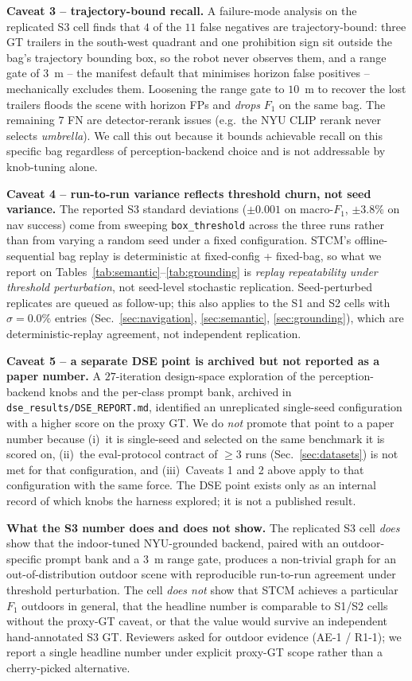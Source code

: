 \noindent\textbf{Caveat 3 -- trajectory-bound recall.}
A failure-mode analysis on the replicated S3 cell finds that $4$
of the $11$ false negatives are trajectory-bound: three GT
trailers in the south-west quadrant and one prohibition sign sit
outside the bag's trajectory bounding box, so the robot never
observes them, and a range gate of $3$~m -- the manifest default
that minimises horizon false positives -- mechanically excludes
them. Loosening the range gate to $10$~m to recover the lost
trailers floods the scene with horizon FPs and \emph{drops} $F_1$
on the same bag. The remaining $7$ FN are detector-rerank issues
(e.g.\ the NYU CLIP rerank never selects \emph{umbrella}). We
call this out because it bounds achievable recall on this specific
bag regardless of perception-backend choice and is not addressable
by knob-tuning alone.

\noindent\textbf{Caveat 4 -- run-to-run variance reflects
threshold churn, not seed variance.}
The reported S3 standard deviations ($\pm 0.001$ on macro-$F_1$,
$\pm 3.8\%$ on nav success) come from sweeping
\texttt{box\_threshold} across the three runs rather than from
varying a random seed under a fixed configuration. STCM's offline-
sequential bag replay is deterministic at fixed-config + fixed-bag,
so what we report on Tables~\ref{tab:semantic}--\ref{tab:grounding}
is \emph{replay repeatability under threshold perturbation}, not
seed-level stochastic replication. Seed-perturbed replicates are
queued as follow-up; this also applies to the S1 and S2 cells with
$\sigma{=}0.0\%$ entries (Sec.~\ref{sec:navigation},
\ref{sec:semantic}, \ref{sec:grounding}), which are
deterministic-replay agreement, not independent replication.

\noindent\textbf{Caveat 5 -- a separate DSE point is archived but
not reported as a paper number.}
A $27$-iteration design-space exploration of the perception-
backend knobs and the per-class prompt bank, archived in
\texttt{dse\_results/DSE\_REPORT.md}, identified an unreplicated
single-seed configuration with a higher score on the proxy GT.
We do \emph{not} promote that point to a paper number because
(i)~it is single-seed and selected on the same benchmark it is
scored on, (ii)~the eval-protocol contract of $\geq 3$ runs
(Sec.~\ref{sec:datasets}) is not met for that configuration, and
(iii)~Caveats 1 and 2 above apply to that configuration with the
same force. The DSE point exists only as an internal record of
which knobs the harness explored; it is not a published result.

\noindent\textbf{What the S3 number does and does not show.}
The replicated S3 cell \emph{does} show that the indoor-tuned
NYU-grounded backend, paired with an outdoor-specific prompt bank
and a $3$~m range gate, produces a non-trivial graph for an
out-of-distribution outdoor scene with reproducible run-to-run
agreement under threshold perturbation. The cell \emph{does not}
show that STCM achieves a particular $F_1$ outdoors in general,
that the headline number is comparable to S1/S2 cells without the
proxy-GT caveat, or that the value would survive an independent
hand-annotated S3 GT. Reviewers asked for outdoor evidence
(AE-1 / R1-1); we report a single headline number under explicit
proxy-GT scope rather than a cherry-picked alternative.
